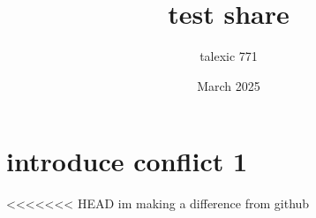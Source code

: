 \documentclass{article}
\title{test share}
\author{talexic 771 }
\date{March 2025}
\begin{document}
\maketitle

\section{introduce conflict 1}
<<<<<<< HEAD
im making a difference from github
\end{document}
